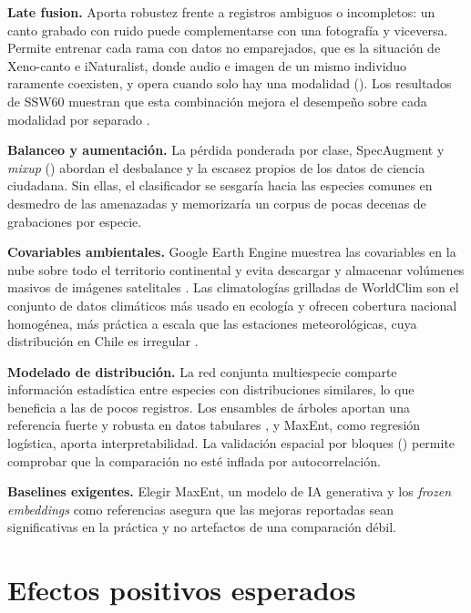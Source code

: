 \textbf{Late fusion.} Aporta robustez frente a registros ambiguos o
incompletos: un canto grabado con ruido puede complementarse con una
fotografía y viceversa. Permite entrenar cada rama con datos no
emparejados, que es la situación de Xeno-canto e iNaturalist, donde audio e
imagen de un mismo individuo raramente coexisten, y opera cuando solo hay
una modalidad (). Los resultados de SSW60
muestran que esta combinación mejora el desempeño sobre cada modalidad por
separado \citep{vanhorn2022ssw60}.

\textbf{Balanceo y aumentación.} La pérdida ponderada por clase, SpecAugment
y \textit{mixup} () abordan el desbalance
y la escasez propios de los datos de ciencia ciudadana. Sin ellas, el
clasificador se sesgaría hacia las especies comunes en desmedro de las
amenazadas y memorizaría un corpus de pocas decenas de grabaciones por
especie.

\textbf{Covariables ambientales.} Google Earth Engine muestrea las
covariables en la nube sobre todo el territorio continental y evita
descargar y almacenar volúmenes masivos de imágenes satelitales
\citep{gorelick2017gee}. Las climatologías grilladas de WorldClim son el
conjunto de datos climáticos más usado en ecología y ofrecen cobertura
nacional homogénea, más práctica a escala que las estaciones
meteorológicas, cuya distribución en Chile es irregular
\citep[p.~63]{guisan2017hsdm}.

\textbf{Modelado de distribución.} La red conjunta multiespecie comparte
información estadística entre especies con distribuciones similares, lo que
beneficia a las de pocos registros. Los ensambles de árboles aportan una
referencia fuerte y robusta en datos tabulares
\citep{valavi2022benchmark}, y MaxEnt, como regresión logística, aporta
interpretabilidad. La validación espacial por bloques
() permite comprobar que la comparación no
esté inflada por autocorrelación.

\textbf{Baselines exigentes.} Elegir MaxEnt, un modelo de IA generativa y
los \textit{frozen embeddings} como referencias asegura que las mejoras
reportadas sean significativas en la práctica y no artefactos de una
comparación débil.

\section{Efectos positivos esperados}\label{sec:efectos}

